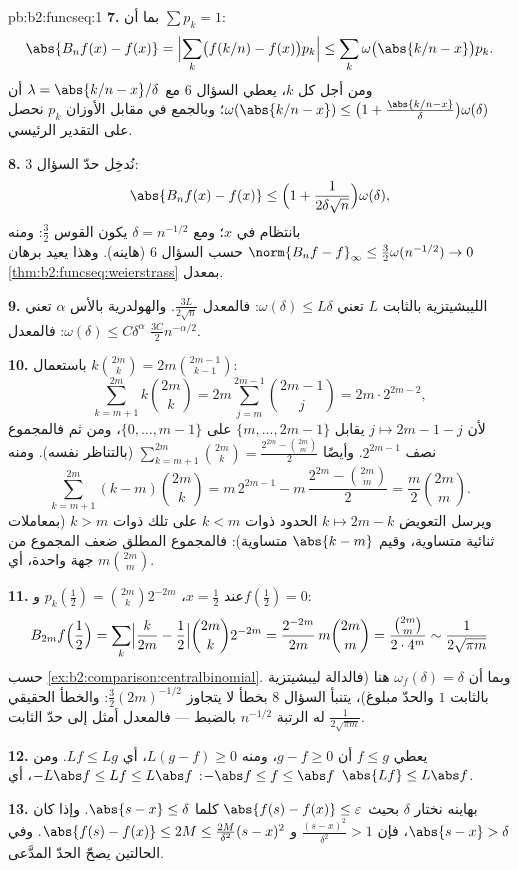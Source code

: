 \begin{solution}{pb:b2:funcseq:1}
\textbf{7.} بما أن $\sum p_k = 1$:
\[
\abs{B_nf(x) - f(x)}
= \Bigl|\sum_k\bigl(f(k/n) - f(x)\bigr)p_k\Bigr|
\leq \sum_k\omega\bigl(\abs{k/n - x}\bigr)p_k .
\]
ومن أجل كل $k$، يعطي السؤال 6 مع $\lambda = \abs{k/n - x}/\delta$
أن $\omega(\abs{k/n-x}) \leq \bigl(1 +
\frac{\abs{k/n-x}}\delta\bigr)\omega(\delta)$؛ وبالجمع في مقابل
الأوزان $p_k$ نحصل على التقدير الرئيسي.

\textbf{8.} نُدخِل حدّ السؤال 3:
\[
\abs{B_nf(x) - f(x)} \leq \Bigl(1 +
\frac{1}{2\delta\sqrt n}\Bigr)\omega(\delta),
\]
بانتظام في $x$؛ ومع $\delta = n^{-1/2}$ يكون القوس
$\frac32$: ومنه $\norm{B_nf - f}_\infty \leq
\frac32\omega(n^{-1/2}) \to 0$ حسب السؤال 6 (هاينه). وهذا
يعيد برهان \cref{thm:b2:funcseq:weierstrass} بمعدل.

\textbf{9.} الليبشيتزية بالثابت $L$ تعني $\omega(\delta) \leq L\delta$:
فالمعدل $\frac{3L}{2\sqrt n}$. والهولدرية بالأس $\alpha$ تعني
$\omega(\delta) \leq C\delta^\alpha$: فالمعدل $\frac{3C}{2}
n^{-\alpha/2}$.

\textbf{10.} باستعمال $k\binom{2m}k = 2m\binom{2m-1}{k-1}$:
\[
\sum_{k=m+1}^{2m}k\binom{2m}k
= 2m\sum_{j=m}^{2m-1}\binom{2m-1}{j}
= 2m\cdot 2^{2m-2},
\]
لأن $j \mapsto 2m-1-j$ يقابل $\{m,\dots,2m-1\}$ على
$\{0,\dots,m-1\}$، ومن ثم فالمجموع نصف $2^{2m-1}$. وأيضًا
$\sum_{k=m+1}^{2m}\binom{2m}k = \frac{2^{2m} -
\binom{2m}m}{2}$ (بالتناظر نفسه). ومنه
\[
\sum_{k=m+1}^{2m}(k-m)\binom{2m}k
= m\,2^{2m-1} - m\,\frac{2^{2m} - \binom{2m}m}{2}
= \frac m2\binom{2m}m .
\]
ويرسل التعويض $k \mapsto 2m-k$ الحدود ذوات $k < m$
على تلك ذوات $k > m$ (بمعاملات ثنائية متساوية، وقيم $\abs{k-m}$ متساوية):
فالمجموع المطلق ضعف المجموع من جهة واحدة، أي $m\binom{2m}m$.

\textbf{11.} عند $x = \frac12$، $p_k(\tfrac12) =
\binom{2m}k2^{-2m}$ و$f(\tfrac12) = 0$:
\[
B_{2m}f\Bigl(\frac12\Bigr)
= \sum_k\Bigl|\frac{k}{2m} - \frac12\Bigr|
\binom{2m}k 2^{-2m}
= \frac{2^{-2m}}{2m}\,m\binom{2m}m
= \frac{\binom{2m}m}{2\cdot4^m}
\sim \frac{1}{2\sqrt{\pi m}}
\]
حسب \cref{ex:b2:comparison:centralbinomial}. وبما أن $\omega_f
(\delta) = \delta$ هنا (فالدالة ليبشيتزية بالثابت $1$ والحدّ
مبلوغ)، يتنبأ السؤال 8 بخطأ لا يتجاوز
$\frac32(2m)^{-1/2}$: والخطأ الحقيقي $\frac{1}{2\sqrt{\pi m}}$
له الرتبة $n^{-1/2}$ بالضبط --- فالمعدل أمثل إلى حدّ
الثابت.

\textbf{12.} يعطي $f \leq g$ أن $g - f \geq 0$، ومنه $L(g-f) \geq
0$، أي $Lf \leq Lg$. ومن $-\abs f \leq f \leq \abs f$:
$-L\abs f \leq Lf \leq L\abs f$، أي $\abs{Lf} \leq
L\abs f$.

\textbf{13.} بهاينه نختار $\delta$ بحيث $\abs{f(s)-f(x)}
\leq \varepsilon$ كلما $\abs{s-x} \leq \delta$. وإذا كان
$\abs{s - x} > \delta$، فإن $\frac{(s-x)^2}{\delta^2} > 1$ و
$\abs{f(s)-f(x)} \leq 2M \leq \frac{2M}{\delta^2}(s-x)^2$. وفي
الحالتين يصحّ الحدّ المدَّعى.


\end{solution}
